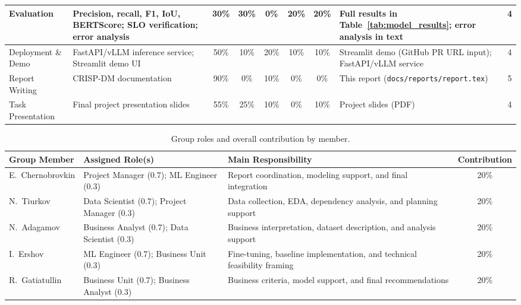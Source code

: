 \documentclass[11pt]{article}
\begin{document}
\begin{table}[H]
{\begin{tabular}{@{}lp{5.8cm}cccccp{4.5cm}c@{}}
Evaluation &
Precision, recall, F1, IoU, BERTScore; SLO verification; error analysis &
30\% & 30\% & 0\% & 20\% & 20\% &
Full results in Table~\ref{tab:model_results}; error analysis in text &
4 \\
\midrule

Deployment \& Demo &
FastAPI/vLLM inference service; Streamlit demo UI &
50\% & 10\% & 20\% & 10\% & 10\% &
Streamlit demo (GitHub PR URL input); FastAPI/vLLM service &
4 \\
\midrule

Report Writing &
CRISP-DM documentation &
90\% & 0\% & 10\% & 0\% & 0\% &
This report (\texttt{docs/reports/report.tex}) &
5 \\
\midrule

Task Presentation &
Final project presentation slides &
55\% & 25\% & 10\% & 0\% & 10\% &
Project slides (PDF) &
4 \\

\bottomrule
\end{tabular}}
\end{table}
\begin{table}[H]
\centering
\caption{Group roles and overall contribution by member.}
\label{tab:group_roles}
\begin{tabular}{@{}p{3.2cm}p{6.4cm}p{3.2cm}c@{}}
\toprule
\textbf{Group Member} & \textbf{Assigned Role(s)} & \textbf{Main Responsibility} & \textbf{Contribution} \\ \midrule

E.\ Chernobrovkin &
Project Manager (0.7); ML Engineer (0.3) &
Report coordination, modeling support, and final integration &
20\% \\ \midrule

N.\ Tiurkov &
Data Scientist (0.7); Project Manager (0.3) &
Data collection, EDA, dependency analysis, and planning support &
20\% \\ \midrule

N.\ Adagamov &
Business Analyst (0.7); Data Scientist (0.3) &
Business interpretation, dataset description, and analysis support &
20\% \\ \midrule

I.\ Ershov &
ML Engineer (0.7); Business Unit (0.3) &
Fine-tuning, baseline implementation, and technical feasibility framing &
20\% \\ \midrule

R.\ Gatiatullin &
Business Unit (0.7); Business Analyst (0.3) &
Business criteria, model support, and final recommendations &
20\% \\ \bottomrule

\end{tabular}
\end{table}
\end{document}
